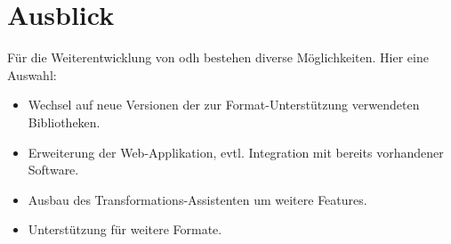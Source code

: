 \section*{Ausblick}
Für die Weiterentwicklung von \acl{odh} bestehen diverse Möglichkeiten. Hier eine Auswahl:
\begin{itemize}
\item Wechsel auf neue Versionen der zur Format-Unterstützung verwendeten Bibliotheken.
\item Erweiterung der Web-Applikation, evtl. Integration mit bereits vorhandener Software.
\item Ausbau des Transformations-Assistenten um weitere Features.
\item Unterstützung für weitere Formate.
\end{itemize}

